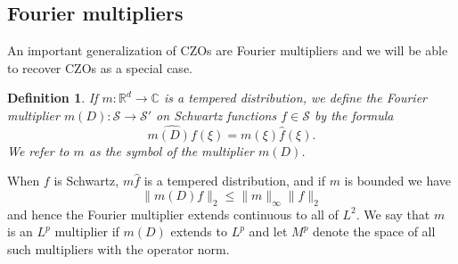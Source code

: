 \documentclass[11pt]{article}
\newtheorem*{defn}{Definition}
\theoremstyle{remark}
\newcommand{\calS}{\mathcal{S}}
\newcommand{\1}{\textbf{1}}
\def\norm#1{\| #1  \|}
\newcommand{\bbR}{\mathbb{R}}
\newcommand{\bbC}{\mathbb{C}}
\begin{document}
\subsection*{Fourier multipliers}
An important generalization of CZOs are Fourier multipliers and we will be able to recover CZOs as a special case.
\begin{defn}
If $m : \bbR^d \to \bbC$ is a tempered distribution, we define the Fourier multiplier $m(D): \calS \to \calS'$ on Schwartz functions $f \in \calS$ by the formula
\[
\widehat{m(D)f}(\xi) = m(\xi) \hat{f}(\xi).
\]
We refer to $m$ as the symbol of the multiplier $m(D)$.
\end{defn}
When $f$ is Schwartz, $m \hat{f}$ is a tempered distribution, and if $m$ is bounded we have
\[
\norm{m(D)f}_2 \leq \norm{m}_\infty \norm{f}_2
\]
and hence the Fourier multiplier extends continuous to all of $L^2$. We say that $m$ is an $L^p$ multiplier if $m(D)$ extends to $L^p$ and let $M^p$ denote the space of all such multipliers with the operator norm.
\end{document}
